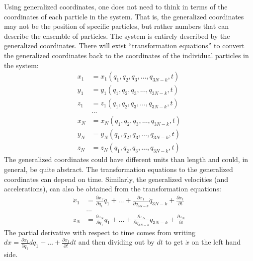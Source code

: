 Using generalized coordinates, one does not need to think in terms of the coordinates of each particle in the system. That is, the generalized coordinates may not be the position of specific particles, but rather numbers that can describe the ensemble of particles. The system is entirely described by the generalized coordinates. There will exist ``transformation equations'' to convert the generalized coordinates back to the coordinates of the individual particles in the system:
\begin{align}
x_1&=x_1(q_1,q_2,q_3,\dots,q_{3N-k},t)\nonumber\\
y_1&=y_1(q_1,q_2,q_3,\dots,q_{3N-k},t)\nonumber\\
z_1&=z_1(q_1,q_2,q_3,\dots,q_{3N-k},t)\nonumber\\
&\dots\nonumber\\
x_N&=x_N(q_1,q_2,q_3,\dots,q_{3N-k},t)\nonumber\\
y_N&=y_N(q_1,q_2,q_3,\dots,q_{3N-k},t)\nonumber\\
z_N&=z_N(q_1,q_2,q_3,\dots,q_{3N-k},t)\nonumber
\end{align}
The generalized coordinates could have different units than length and could, in general, be quite abstract. The transformation equations to the generalized coordinates can depend on time.
\noindent
Similarly, the generalized velocities (and accelerations), can also be obtained from the transformation equations:
\begin{align}
\dot{x}_1&=\frac{\partial x_1}{\partial q_1}\dot{q}_1+\dots+\frac{\partial x_1}{\partial q_{3N-k}}\dot{q}_{3N-k}+\frac{\partial x_1}{\partial t}\nonumber\\
&\dots\nonumber\\
\dot{z}_N&=\frac{\partial z_N}{\partial q_1}\dot{q}_1+\dots+\frac{\partial z_N}{\partial q_{3N-k}}\dot{q}_{3N-k}+\frac{\partial z_N}{\partial t}\nonumber
\end{align}
The partial derivative with respect to time comes from writing $dx = \frac{\partial x_1}{\partial q_1}dq_1+\dots +\frac{\partial x_1}{\partial t} dt$ and then dividing out by $dt$ to get $\dot{x}$ on the left hand side.
